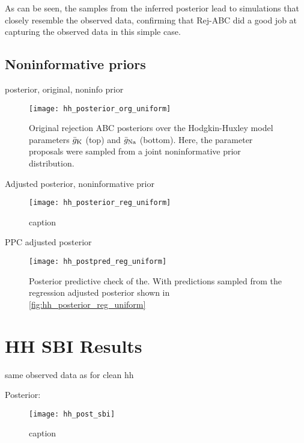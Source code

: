 As can be seen, the samples from the inferred posterior lead to simulations that closely resemble the observed data, confirming that Rej-ABC did a good job at capturing the observed data in this simple case.

\subsection{Noninformative priors}

posterior, original, noninfo prior

\begin{figure}[H]
    \centering
    \texttt{[image: hh\_posterior\_org\_uniform]}
    \caption{Original rejection ABC posteriors over the Hodgkin-Huxley model parameters $\bar{g}_{\mathrm{K}}$ (top) and $\bar{g}_{\mathrm{Na}}$ (bottom). Here, the parameter proposals were sampled from a joint noninformative prior distribution.}
    \label{fig:fig1}
\end{figure}

Adjusted posterior, noninformative prior

\begin{figure}[H]
    \centering
    \texttt{[image: hh\_posterior\_reg\_uniform]}
    \caption{caption}
    \label{fig:hh_posterior_reg_uniform}
\end{figure} 

PPC adjusted posterior 

\begin{figure}[H]
    \centering
    \texttt{[image: hh\_postpred\_reg\_uniform]}
    \caption{Posterior predictive check of the. With predictions sampled from the regression adjusted posterior shown in \autoref{fig:hh_posterior_reg_uniform}}
    \label{fig:fig1}
\end{figure}


\section{HH SBI Results}

same observed data as for clean hh

Posterior:

\begin{figure}[H]
    \centering
    \texttt{[image: hh\_post\_sbi]}
    \caption{caption}
    \label{fig:fig1}
\end{figure}

